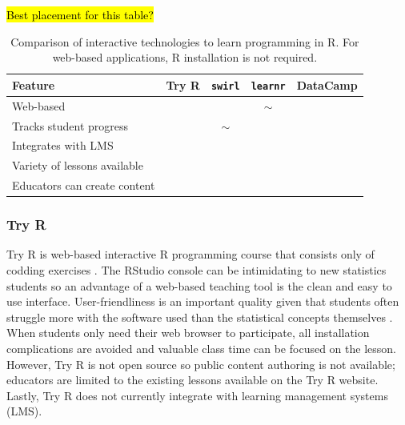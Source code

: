 \documentclass{tise_style_doi}
\newcommand{\cmark}{\ding{51}} %
\newcommand{\xmark}{\ding{55}} %
\begin{document}
\hl{Best placement for this table?}

\begin{table}
\begin{tabular}{lcccc}
\toprule
Feature                      & Try R  & \texttt{swirl}    & \texttt{learnr} & DataCamp \\
\midrule
Web-based                    & \cmark & \xmark            &  $\sim$         & \cmark   \\
Tracks student progress      & \xmark & $\sim$            &  \xmark         & \cmark   \\
Integrates with LMS          & \xmark & \xmark            &  \xmark         & \cmark   \\
Variety of lessons available & \xmark & \cmark            &  \xmark         & \cmark   \\
Educators can create content & \xmark & \cmark            &  \cmark         & \cmark   \\
\bottomrule
\end{tabular}
\caption{Comparison of interactive technologies to learn programming in R.
For web-based applications, R installation is not required.}
\label{tab:compare}
\end{table}

\subsubsection{Try R}

Try R is web-based interactive R programming course that consists only of
codding exercises \citep{TryR}. The RStudio console
can be intimidating to new statistics students
so an  advantage of a web-based teaching tool is the clean and easy to use interface.
User-friendliness is an important quality given that students often struggle more
with the software used than the statistical concepts themselves \citep{Hare2017}.
When students only need their web browser to participate, all installation
complications are avoided and valuable class time can be focused on the lesson.
However, Try R is not open source so public content authoring is not available;
educators are limited to the existing lessons available on the Try R website.
Lastly, Try R does not currently integrate with learning management systems (LMS).
\end{document}
